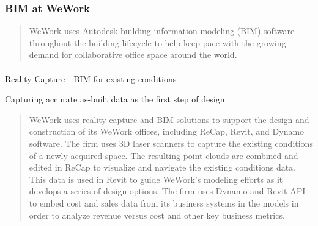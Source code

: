 \documentclass[
]{article}
\makeatletter
\let\oldparagraph\paragraph
\renewcommand{\paragraph}{
    \@ifstar
      \xxxParagraphStar
      \xxxParagraphNoStar
  }
\newcommand{\xxxParagraphStar}[1]{\oldparagraph*{#1}\mbox{}}
\newcommand{\xxxParagraphNoStar}[1]{\oldparagraph{#1}\mbox{}}
\makeatother
\begin{document}
\subsubsection{BIM at WeWork}\label{bim-at-wework}

\begin{quote}
WeWork uses Autodesk building information modeling (BIM) software
throughout the building lifecycle to help keep pace with the growing
demand for collaborative office space around the world.
\end{quote}

\paragraph{Reality Capture - BIM for existing
conditions}\label{reality-capture---bim-for-existing-conditions}

Capturing accurate as-built data as the first step of design

\begin{quote}
WeWork uses reality capture and BIM solutions to support the design and
construction of its WeWork offices, including ReCap, Revit, and Dynamo
software. The firm uses 3D laser scanners to capture the existing
conditions of a newly acquired space. The resulting point clouds are
combined and edited in ReCap to visualize and navigate the existing
conditions data. This data is used in Revit to guide WeWork's modeling
efforts as it develops a series of design options. The firm uses Dynamo
and Revit API to embed cost and sales data from its business systems in
the models in order to analyze revenue versus cost and other key
business metrics.
\end{quote}
\end{document}

